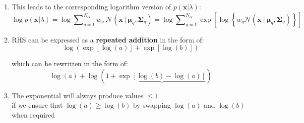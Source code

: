 \documentclass[usenames,dvipsnames]{beamer}
\def\Vec#1{{\boldsymbol{#1}}}
\def\Mat#1{{\boldsymbol{#1}}}
\begin{document}
\begin{frame}
\begin{enumerate}[{~~$\boldsymbol{\bullet}$}]
\item
This leads to the corresponding logarithm version of $p(\Vec{x} | \lambda)$:
%
\begin{equation*}
\log p(\Vec{x} | \lambda)
= 
\log \sum\nolimits_{g=1}^{N_G} w_g ~ {{\mathcal{N}}}( \Vec{x} ~|~ \Vec{\mu}_g, \Mat{\Sigma}_g )
=
\log \sum\nolimits_{g=1}^{N_G} \exp\left[ \log \left\{ w_g {{\mathcal{N}}}( \Vec{x} ~|~ \Vec{\mu}_g, \Mat{\Sigma}_g ) \right\} \right]
\end{equation*}

\item
RHS can be expressed as a {\bf repeated addition} in the form of:
\begin{equation*}
\log\left( \exp\left[\log(a)\right] + \exp\left[\log(b)\right] \right)
\end{equation*}

which can be rewritten in the form of:
\begin{equation*}
\log(a) + \log\left( 1 + \underbrace{\exp\left[ \log(b) - \log(a) \right]} \right)
\end{equation*}

\item
The exponential will always produce values $\leq 1$\\
if we ensure that {$\log(a) \geq \log(b)$} by swapping $\log(a)$ and $\log(b)$ when required

\end{enumerate}
\end{frame}

%
%
%
\end{document}
